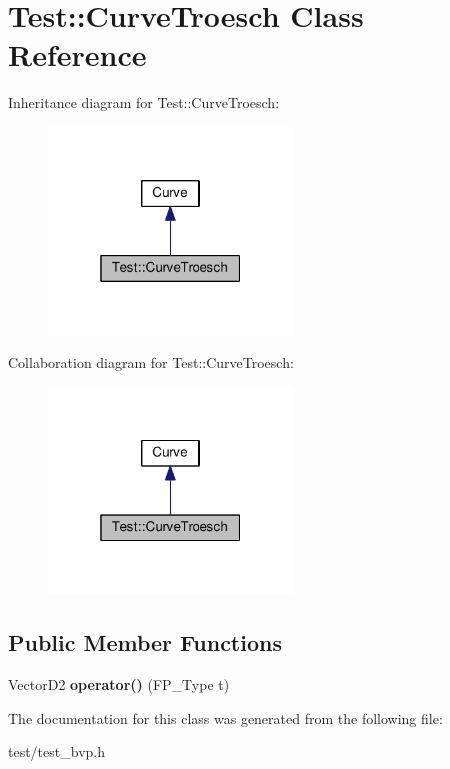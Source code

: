 \hypertarget{classTest_1_1CurveTroesch}{}\section{Test\+:\+:Curve\+Troesch Class Reference}
\label{classTest_1_1CurveTroesch}


Inheritance diagram for Test\+:\+:Curve\+Troesch\+:\nopagebreak
\begin{figure}[H]
\begin{center}
\leavevmode
\includegraphics[width=184pt]{classTest_1_1CurveTroesch__inherit__graph}
\end{center}
\end{figure}


Collaboration diagram for Test\+:\+:Curve\+Troesch\+:\nopagebreak
\begin{figure}[H]
\begin{center}
\leavevmode
\includegraphics[width=184pt]{classTest_1_1CurveTroesch__coll__graph}
\end{center}
\end{figure}
\subsection*{Public Member Functions}
\begin{DoxyCompactItemize}
\item 
\mbox{\label{classTest_1_1CurveTroesch_a1b9232e93831fa367a4b3cc6f3ad8bcc}} 
Vector\+D2 {\bfseries operator()} (F\+P\+\_\+\+Type t)
\end{DoxyCompactItemize}


The documentation for this class was generated from the following file\+:\begin{DoxyCompactItemize}
\item 
test/test\+\_\+bvp.\+h\end{DoxyCompactItemize}
